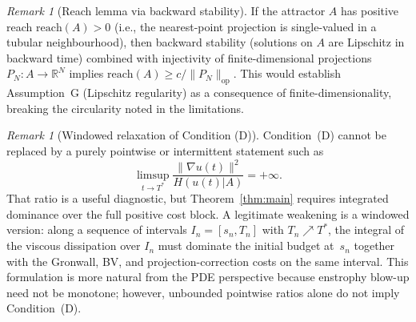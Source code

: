 \documentclass[12pt,a4paper]{article}
\theoremstyle{definition}
\theoremstyle{plain}
\theoremstyle{remark}
\newtheorem{remark}[definition]{Remark}
\begin{document}
\begin{remark}[Reach lemma via backward stability]
\label{rem:reach-lemma}
If the attractor $A$ has positive reach $\mathrm{reach}(A) > 0$ (i.e., the nearest-point projection is single-valued in a tubular neighbourhood), then backward stability (solutions on $A$ are Lipschitz in backward time) combined with injectivity of finite-dimensional projections $P_N: A \to \mathbb{R}^N$ implies $\mathrm{reach}(A) \geq c/\|P_N\|_{\mathrm{op}}$. This would establish Assumption~G (Lipschitz regularity) as a consequence of finite-dimensionality, breaking the circularity noted in the limitations.
\end{remark}

\begin{remark}[Windowed relaxation of Condition (D)]
\label{rem:condition-d-limsup}
Condition~(D) cannot be replaced by a purely pointwise or intermittent
statement such as
\[
\limsup_{t \to T^*} \frac{\|\nabla u(t)\|^2}{H(u(t)|A)} = +\infty.
\]
That ratio is a useful diagnostic, but Theorem~\ref{thm:main} requires
integrated dominance over the full positive cost block.  A legitimate
weakening is a windowed version: along a sequence of intervals
$I_n=[s_n,T_n]$ with $T_n\nearrow T^*$, the integral of the viscous
dissipation over $I_n$ must dominate the initial budget at~$s_n$
together with the Gronwall, BV, and projection-correction costs on the
same interval.  This formulation is more natural from the PDE
perspective because enstrophy blow-up need not be monotone; however,
unbounded pointwise ratios alone do not imply Condition~(D).
\end{remark}
\end{document}
